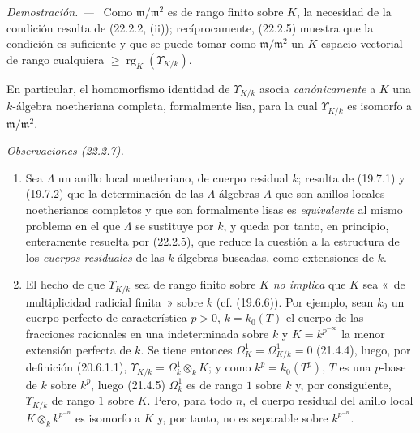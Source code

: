 \documentclass[10pt,oneside]{book}
\makeatletter
\newcommand{\setmanualcurrentlabel}[1]{\def\@currentlabel{#1}}
\newcommand{\oldpage}[2][]{%
  \setcounter{footnote}{0}%
  \marginpar{\scriptsize\textbf{#1}~|~#2}\ignorespaces}
\newenvironment{remarks}[1][]{%
  \setmanualcurrentlabel{#1}\par\medskip\noindent\itshape Observaciones (#1). ---\ }{\par}
\newenvironment{proof}{%
  \par\medskip\noindent\textit{Demostración. ---\ }}{\par}
\makeatother
\begin{document}
\begin{proof}
Como $\mathfrak m/\mathfrak m^2$ es de rango finito sobre $K$, la necesidad
de la condición resulta de (22.2.2, (ii)); recíprocamente, (22.2.5) muestra que
la condición es suficiente y que se puede tomar como
$\mathfrak m/\mathfrak m^2$ un $K$-espacio vectorial de rango cualquiera
$\geqslant\operatorname{rg}_K(\Upsilon_{K/k})$.
\end{proof}

\oldpage[0\textsubscript{IV-1}]{189}

En particular, el homomorfismo identidad de $\Upsilon_{K/k}$ asocia
\emph{canónicamente} a $K$ una $k$-álgebra noetheriana completa, formalmente
lisa, para la cual $\Upsilon_{K/k}$ es isomorfo a
$\mathfrak m/\mathfrak m^2$.

\begin{remarks}[22.2.7]
\label{0.22.2.7-es}
\begin{enumerate}
  \item[(i)] Sea $\Lambda$ un anillo local noetheriano, de cuerpo residual
  $k$; resulta de (19.7.1) y (19.7.2) que la determinación de las
  $\Lambda$-álgebras $A$ que son anillos locales noetherianos completos y que
  son formalmente lisas es \emph{equivalente} al mismo problema en el que
  $\Lambda$ se sustituye por $k$, y queda por tanto, en principio, enteramente
  resuelta por (22.2.5), que reduce la cuestión a la estructura de los
  \emph{cuerpos residuales} de las $k$-álgebras buscadas, como extensiones de
  $k$.

  \item[(ii)] El hecho de que $\Upsilon_{K/k}$ sea de rango finito sobre $K$
  \emph{no implica} que $K$ sea «~de multiplicidad radicial finita~» sobre
  $k$ (cf. (19.6.6)). Por ejemplo, sean $k_0$ un cuerpo perfecto de
  característica $p>0$, $k=k_0(T)$ el cuerpo de las fracciones racionales en
  una indeterminada sobre $k$ y $K=k^{p^{-\infty}}$ la menor extensión
  perfecta de $k$. Se tiene entonces $\Omega^1_K=\Omega^1_{K/k}=0$ (21.4.4),
  luego, por definición (20.6.1.1),
  $\Upsilon_{K/k}=\Omega^1_k\otimes_kK$; y como $k^p=k_0(T^p)$, $T$ es una
  $p$-base de $k$ sobre $k^p$, luego (21.4.5) $\Omega^1_k$ es de rango $1$
  sobre $k$ y, por consiguiente, $\Upsilon_{K/k}$ de rango $1$ sobre $K$.
  Pero, para todo $n$, el cuerpo residual del anillo local
  $K\otimes_kk^{p^{-n}}$ es isomorfo a $K$ y, por tanto, no es separable sobre
  $k^{p^{-n}}$.
\end{enumerate}
\end{remarks}
\end{document}
